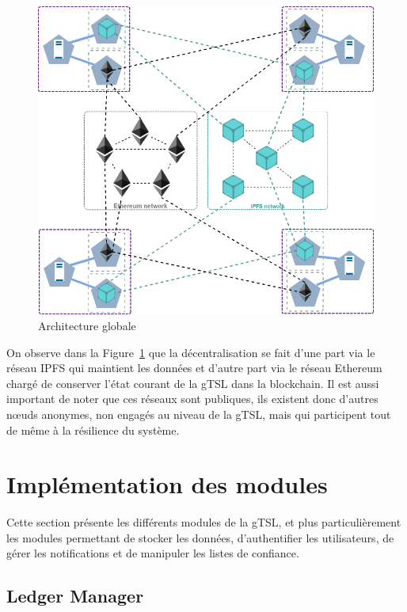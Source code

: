 \documentclass{tnreport}
\begin{document}
\begin{figure}[h]
	\centering
	\includegraphics[scale=0.58]{figures/architecture-global}
	\caption{Architecture globale}
	\label{fig:architecture-global}
\end{figure}

On observe dans la Figure~\ref{fig:architecture-global} que la décentralisation se fait d'une part via le réseau IPFS qui maintient les données et d'autre part via le réseau Ethereum chargé de conserver l'état courant de la gTSL dans la blockchain. Il est aussi important de noter que ces réseaux sont publiques, ils existent donc d'autres nœuds anonymes, non engagés au niveau de la gTSL, mais qui participent tout de même à la résilience du système.

\section{Implémentation des modules}

Cette section présente les différents modules de la gTSL, et plus particulièrement les modules permettant de stocker les données, d'authentifier les utilisateurs, de gérer les notifications et de manipuler les listes de confiance.

\subsection{Ledger Manager}
\label{sec:realisation-ledger}
\end{document}
